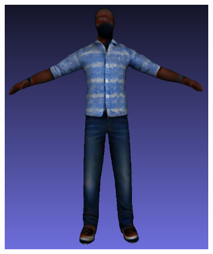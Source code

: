 \begin{figure}[ht]
    \centering
    \small
    \begin{subfigure}[b]{0.23\textwidth}
        \centering
        \includegraphics[width=\textwidth]{figures/appendix/bias_poor_genie_1.png}
        \caption{}
    \end{subfigure}
    \begin{subfigure}[b]{0.1721\textwidth}
        \centering

\end{subfigure}
\end{figure}
